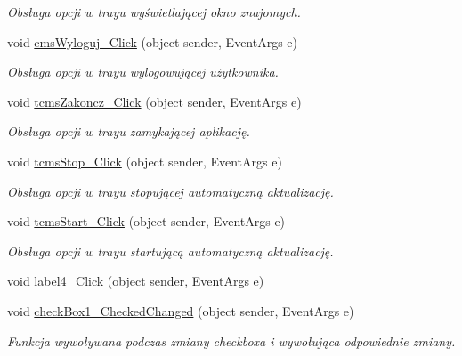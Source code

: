 \begin{CompactItemize}
\begin{CompactList}\small\item\em Obsługa opcji w trayu wyświetlającej okno znajomych. \item\end{CompactList}\item 
void \hyperlink{a00014_320235785478082ecc1aa03461bf2784}{cmsWyloguj\_\-Click} (object sender, EventArgs e)
\begin{CompactList}\small\item\em Obsługa opcji w trayu wylogowującej użytkownika. \item\end{CompactList}\item 
void \hyperlink{a00014_2f9d0525ac9851488072e040aaf7651c}{tcmsZakoncz\_\-Click} (object sender, EventArgs e)
\begin{CompactList}\small\item\em Obsługa opcji w trayu zamykającej aplikację. \item\end{CompactList}\item 
void \hyperlink{a00014_91afe239346bf7e48bbe5472a7c77dee}{tcmsStop\_\-Click} (object sender, EventArgs e)
\begin{CompactList}\small\item\em Obsługa opcji w trayu stopującej automatyczną aktualizację. \item\end{CompactList}\item 
void \hyperlink{a00014_6b5fcbc389c958d850ae624c7c202372}{tcmsStart\_\-Click} (object sender, EventArgs e)
\begin{CompactList}\small\item\em Obsługa opcji w trayu startującą automatyczną aktualizację. \item\end{CompactList}\item 
void \hyperlink{a00014_c585e179ba2eae275bc72800350139ed}{label4\_\-Click} (object sender, EventArgs e)
\item 
void \hyperlink{a00014_9fae1354592491cc868938a644d08225}{checkBox1\_\-CheckedChanged} (object sender, EventArgs e)
\begin{CompactList}\small\item\em Funkcja wywoływana podczas zmiany checkboxa i wywołująca odpowiednie zmiany. \item\end{CompactList}\item 

\end{CompactItemize}

